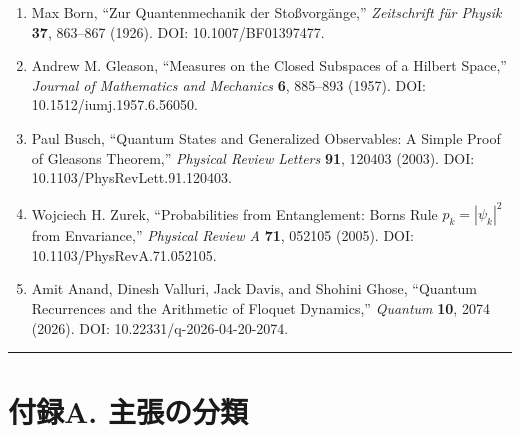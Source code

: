 \documentclass[
  a4paper,
  10pt]{article}
\providecommand{\tightlist}{%
  \setlength{\itemsep}{0pt}\setlength{\parskip}{0pt}}
\begin{document}
\begin{enumerate}
\def\labelenumi{\arabic{enumi}.}
\setcounter{enumi}{4}
\tightlist
\item
  Max Born, ``Zur Quantenmechanik der Stoßvorgänge,'' \emph{Zeitschrift
  für Physik} \textbf{37}, 863--867 (1926). DOI: 10.1007/BF01397477.
\item
  Andrew M. Gleason, ``Measures on the Closed Subspaces of a Hilbert
  Space,'' \emph{Journal of Mathematics and Mechanics} \textbf{6},
  885--893 (1957). DOI: 10.1512/iumj.1957.6.56050.
\item
  Paul Busch, ``Quantum States and Generalized Observables: A Simple
  Proof of Gleason\textquotesingle s Theorem,'' \emph{Physical Review
  Letters} \textbf{91}, 120403 (2003). DOI:
  10.1103/PhysRevLett.91.120403.
\item
  Wojciech H. Zurek, ``Probabilities from Entanglement:
  Born\textquotesingle s Rule \(p_k=|\psi_k|^2\) from Envariance,''
  \emph{Physical Review A} \textbf{71}, 052105 (2005). DOI:
  10.1103/PhysRevA.71.052105.
\item
  Amit Anand, Dinesh Valluri, Jack Davis, and Shohini Ghose, ``Quantum
  Recurrences and the Arithmetic of Floquet Dynamics,'' \emph{Quantum}
  \textbf{10}, 2074 (2026). DOI: 10.22331/q-2026-04-20-2074.
\end{enumerate}

\begin{center}\rule{0.5\linewidth}{0.5pt}\end{center}

\section{付録A.
主張の分類}\label{ux4ed8ux9332a-ux4e3bux5f35ux306eux5206ux985e}
\end{document}
